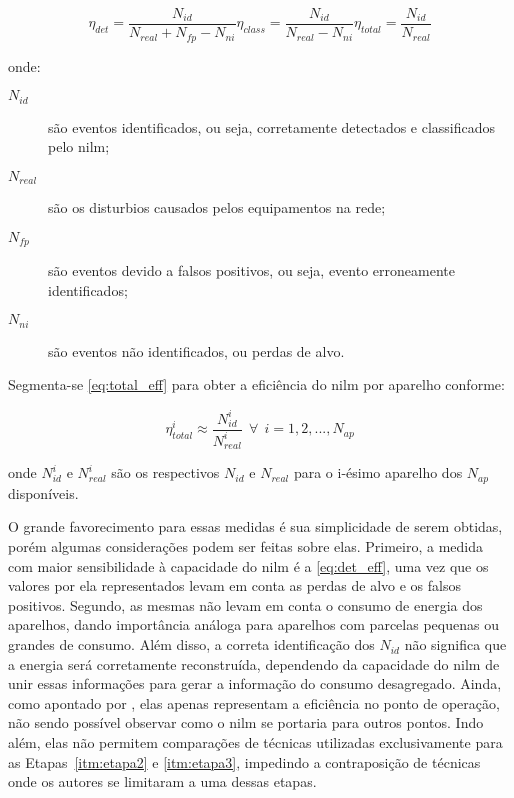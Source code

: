 \begin{subequations}\label{eq:eff}
\begin{equation}\label{eq:det_eff}
\eta_{det} = \frac{N_{id}}{N_{real} + N_{fp} - N_{ni}}
\end{equation}
\begin{equation}\label{eq:class_eff}
\eta_{class} = \frac{N_{id}}{N_{real} - N_{ni}}
\end{equation}
\begin{equation}\label{eq:total_eff}
\eta_{total} = \frac{N_{id}}{N_{real}}
\end{equation}
\end{subequations}

\noindent onde:  

\begin{description}
\item[$N_{id}$] são eventos identificados, ou seja, corretamente
detectados e classificados pelo \gls{nilm}; 
\item[$N_{real}$] são os disturbios causados pelos equipamentos
na rede;
\item[$N_{fp}$] são eventos devido a falsos positivos, ou seja,
evento erroneamente identificados;
\item[$N_{ni}$] são eventos não identificados, ou perdas de alvo.
\end{description}

Segmenta-se \ref{eq:total_eff} para obter a eficiência do \gls{nilm}
por aparelho conforme:

\begin{equation}\label{eq:app_eff}
\eta_{total}^i\approx\frac{N_{id}^i}{N_{real}^i} ~~ \forall ~~ i =
1,2,...,N_{ap}
\end{equation}

\noindent onde $N_{id}^i$ e $N_{real}^i$ são os respectivos
$N_{id}$ e $N_{real}$ para o i-ésimo aparelho dos $N_{ap}$
disponíveis.

O grande favorecimento para essas medidas é sua simplicidade de serem
obtidas, porém algumas considerações podem ser feitas sobre elas.
Primeiro, a medida com maior sensibilidade à capacidade do \gls{nilm}
é a \ref{eq:det_eff}, uma vez que os valores por ela representados
levam em conta as perdas de alvo e os falsos positivos.
Segundo, as mesmas não levam em conta o consumo de energia dos
aparelhos, dando importância análoga para aparelhos com parcelas
pequenas ou grandes de consumo. Além disso, a correta identificação
dos $N_{id}$ não significa que a energia será corretamente
reconstruída, dependendo da capacidade do \gls{nilm} de unir essas
informações para gerar a informação do consumo desagregado.  Ainda,
como apontado por \cite{nilm_zeifman_review_2011}, elas apenas
representam a eficiência no ponto de operação, não sendo possível
observar como o \gls{nilm} se portaria para outros pontos. Indo além,
elas não permitem comparações de técnicas utilizadas exclusivamente para
as Etapas~\ref{itm:etapa2} e \ref{itm:etapa3}, impedindo a
contraposição de técnicas onde os autores se limitaram a uma dessas
etapas.


